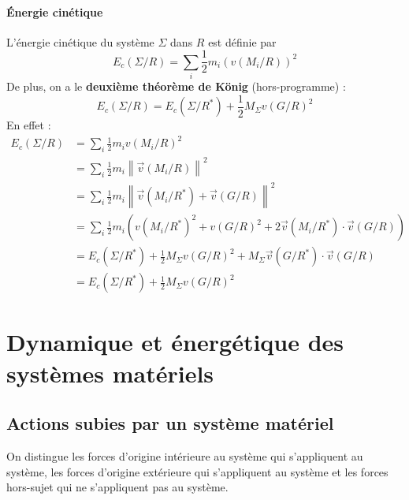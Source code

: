 \documentclass[french]{book}
\theoremstyle{plain}
\theoremstyle{definition}
\theoremstyle{remark}
\newcommand{\st}{^*}
\begin{document}
\paragraph{Énergie cinétique} L'énergie cinétique du système $\Sigma$ dans $R$ est définie par $$E_c(\Sigma/R)=\sum_i \frac{1}{2}m_i\left(v(M_i/R)\right)^2$$ De plus, on a le \textbf{deuxième théorème de König} (hors-programme) : $$E_c(\Sigma/R)=E_c(\Sigma/R\st)+\frac{1}{2}M_\Sigma v(G/R)^2$$ En effet : 
\begin{align*}
	E_c(\Sigma/R)& =\sum_i \frac{1}{2}m_iv(M_i/R)^2 \\
	& = \sum_i \frac{1}{2}m_i\left\lVert \overrightarrow{v}(M_i/R)\right\rVert^2 \\
	& = \sum_i \frac{1}{2}m_i\left\lVert \overrightarrow{v}(M_i/R\st)+\overrightarrow{v}(G/R)\right\rVert^2 \\
	& = \sum_i \frac{1}{2}m_i\left(v(M_i/R\st)^2+v(G/R)^2+2\overrightarrow{v}(M_i/R\st)\cdot\overrightarrow{v}(G/R)\right) \\
	& = E_c(\Sigma/R\st)+\frac{1}{2}M_\Sigma v(G/R)^2+M_\Sigma\overrightarrow{v}(G/R\st)\cdot\overrightarrow{v}(G/R) \\
	& = E_c(\Sigma/R\st)+\frac{1}{2}M_\Sigma v(G/R)^2
\end{align*}
\section{Dynamique et énergétique des systèmes matériels}
\subsection{Actions subies par un système matériel}
On distingue les forces d'origine intérieure au système qui s'appliquent au système, les forces d'origine extérieure qui s'appliquent au système et les forces hors-sujet qui ne s'appliquent pas au système.
\end{document}
